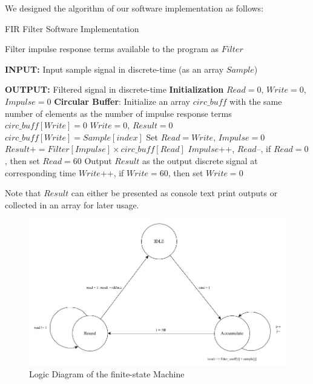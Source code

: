 \documentclass[conference]{IEEEtran}
\begin{document}
We designed the algorithm of our software implementation as follows:
\begin{algorithm}
    \caption{FIR Filter Software Implementation}
  \begin{algorithmic}[1]
    \REQUIRE Filter impulse response terms available to the program as $Filter$
    \item[\textbf{INPUT:}] Input sample signal in discrete-time (as an array $Sample$)
    \item[\textbf{OUTPUT:}]  Filtered signal in discrete-time
    \STATE \textbf{Initialization} $Read = 0$, $Write = 0$, $Impulse = 0$
    \STATE \textbf{Circular Buffer}: Initialize an array $circ\_buff$ with the same number of elements as the number of impulse response terms
        \STATE $circ\_buff[Write] = 0$
    \ENDWHILE
    \STATE $Write = 0$, $Result = 0$
        \STATE $circ\_buff[Write] = Sample[index]$
        \STATE Set $Read = Write$, $Impulse = 0$
            \STATE $Result += Filter[Impulse] \times circ\_buff[Read]$
            \STATE $Impulse$++, $Read$--, if $Read = 0$, then set $Read = 60$
        \ENDWHILE
        \STATE Output $Result$ as the output discrete signal at corresponding time
        \STATE $Write$++, if $Write = 60$, then set $Write = 0$
    \ENDFOR
  \end{algorithmic}
\end{algorithm}

Note that $Result$ can either be presented as console text print outputs or collected in an array for later usage.

\begin{figure}[htbp]
    \centerline{\includegraphics[width=\linewidth]{Figures/Filter/fsm_hardware.jpg}}
    \caption{Logic Diagram of the finite-state Machine}
    \label{fsm}
\end{figure}
\end{document}

